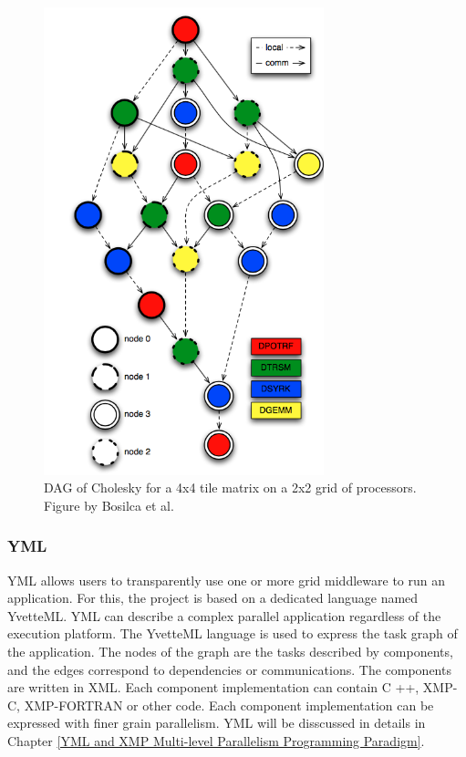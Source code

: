 \begin{figure}[h]
	\centering
	\includegraphics[width=3.2in]{fig/workflow_cholesky.png}
	\caption{DAG of Cholesky for a 4x4 tile matrix on a 2x2 grid of processors. Figure by Bosilca et al. \cite{bosilca2012dague}}
	\label{fig:workflow_cholesky}
\end{figure}


\subsubsection{YML}

YML \cite{delannoyyml} allows users to transparently use one or more grid middleware to run an application. For this, the project is based on a dedicated language named YvetteML. YML can describe a complex parallel application regardless of the execution platform. The YvetteML language is used to express the task graph of the application. The nodes of the graph are the tasks described by components, and the edges correspond to dependencies or communications. The components are written in XML. Each component implementation can contain C ++, XMP-C, XMP-FORTRAN or other code. Each component implementation can be expressed with finer grain parallelism. YML will be disscussed in details in Chapter \ref{YML and XMP Multi-level Parallelism Programming Paradigm}.

